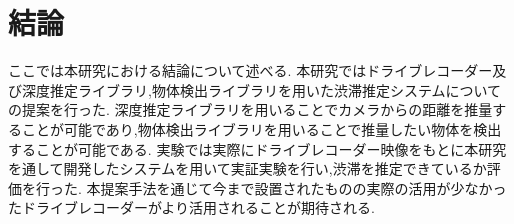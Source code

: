 \section{結論}
ここでは本研究における結論について述べる.
本研究ではドライブレコーダー及び深度推定ライブラリ,物体検出ライブラリを用いた渋滞推定システムについての提案を行った.
深度推定ライブラリを用いることでカメラからの距離を推量することが可能であり,物体検出ライブラリを用いることで推量したい物体を検出することが可能である.
実験では実際にドライブレコーダー映像をもとに本研究を通して開発したシステムを用いて実証実験を行い,渋滞を推定できているか評価を行った.
本提案手法を通じて今まで設置されたものの実際の活用が少なかったドライブレコーダーがより活用されることが期待される.